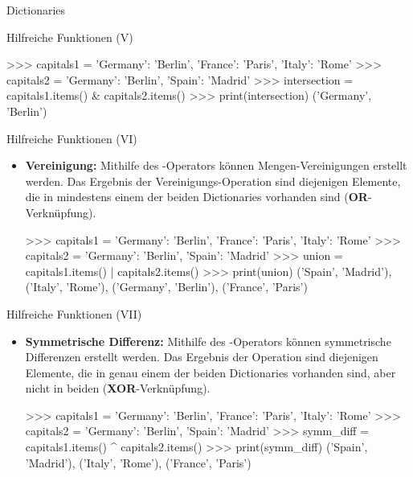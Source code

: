 \begin{subsection}{Dictionaries}
\begin{frame}[fragile]{Hilfreiche Funktionen (V)}
\begin{itemize}
\begin{pyconcode}
>>> capitals1 = {'Germany': 'Berlin', 'France': 'Paris', 'Italy': 'Rome'}
>>> capitals2 = {'Germany': 'Berlin', 'Spain': 'Madrid'}
>>> intersection =  capitals1.items() & capitals2.items()
>>> print(intersection)
{('Germany', 'Berlin')}
\end{pyconcode}                
            
            \end{itemize}
                
        \end{frame}
        
        \begin{frame}[fragile]{Hilfreiche Funktionen (VI)}
                
                \begin{itemize}
                    \item \textbf{Vereinigung:} Mithilfe des \code{|}-Operators können Mengen-Vereinigungen erstellt werden. Das Ergebnis der Vereinigungs-Operation sind diejenigen Elemente, die in mindestens einem der beiden Dictionaries vorhanden sind (\textbf{OR}-Verknüpfung).
      
  
\begin{pyconcode}
>>> capitals1 = {'Germany': 'Berlin', 'France': 'Paris', 'Italy': 'Rome'}
>>> capitals2 = {'Germany': 'Berlin', 'Spain': 'Madrid'}
>>> union =  capitals1.items() | capitals2.items()
>>> print(union)
{('Spain', 'Madrid'), ('Italy', 'Rome'), ('Germany', 'Berlin'), ('France', 'Paris')}
\end{pyconcode}                
                
          \end{itemize}
                
        \end{frame}
        
        \begin{frame}[fragile]{Hilfreiche Funktionen (VII)}
                
                \begin{itemize}
                    \item \textbf{Symmetrische Differenz:} Mithilfe des \code{\^}-Operators können symmetrische Differenzen erstellt werden. Das Ergebnis der Operation sind diejenigen Elemente, die in genau einem der beiden Dictionaries vorhanden sind, aber nicht in beiden (\textbf{XOR}-Verknüpfung).
      
  
\begin{pyconcode}
>>> capitals1 = {'Germany': 'Berlin', 'France': 'Paris', 'Italy': 'Rome'}
>>> capitals2 = {'Germany': 'Berlin', 'Spain': 'Madrid'}
>>> symm_diff =  capitals1.items() ^ capitals2.items()
>>> print(symm_diff)
{('Spain', 'Madrid'), ('Italy', 'Rome'), ('France', 'Paris')}
\end{pyconcode}                
                

\end{itemize}
\end{frame}
\end{subsection}
